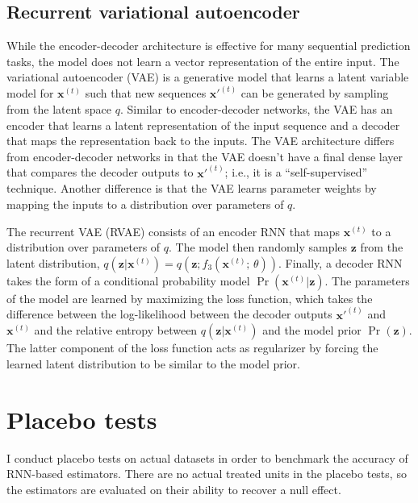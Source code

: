\documentclass[hidelinks,12pt]{article}
\begin{document}
\subsection{Recurrent variational autoencoder}

While the encoder-decoder architecture is effective for many sequential prediction tasks, the model does not learn a vector representation of the entire input. The variational autoencoder (VAE) \citep{kingma2013auto} is a generative model that learns a latent variable model for $\boldsymbol{x}^{(t)}$ such that new sequences $\boldsymbol{x'}^{(t)}$ can be generated by sampling from the latent space $q$. Similar to encoder-decoder networks, the VAE has an encoder that learns a latent representation of the input sequence and a decoder that maps the representation back to the inputs. The VAE architecture differs from encoder-decoder networks in that the VAE doesn't have a final dense layer that compares the decoder outputs to  $\boldsymbol{x'}^{(t)}$; i.e., it is a ``self-supervised'' technique. Another difference is that the VAE learns parameter weights by mapping the inputs to a distribution over parameters of $q$.

The recurrent VAE (RVAE) \citep{fabius2014variational, chung2015recurrent,bowman2015generating} consists of an encoder RNN that maps $\boldsymbol{x}^{(t)}$ to a distribution over parameters of $q$. The model then randomly samples $\boldsymbol{z}$ from the latent distribution, $q(\boldsymbol{z} | \boldsymbol{x}^{(t)}) = q (\boldsymbol{z}; f_3 (\boldsymbol{x}^{(t)};\, \theta))$. Finally, a decoder RNN takes the form of a conditional probability model $\Pr (\boldsymbol{x}^{(t)} | \boldsymbol{z})$. The parameters of the model are learned by maximizing the loss function, which takes the difference between the log-likelihood between the decoder outputs $\boldsymbol{x'}^{(t)}$ and $\boldsymbol{x}^{(t)}$ and the relative entropy between  $q(\boldsymbol{z} | \boldsymbol{x}^{(t)})$ and the model prior $\Pr (\boldsymbol{z})$. The latter component of the loss function acts as regularizer by forcing the learned latent distribution to be similar to the model prior. 

\section{Placebo tests} \label{placebo}

I conduct placebo tests on actual datasets in order to benchmark the accuracy of RNN-based estimators. There are no actual treated units in the placebo tests, so the estimators are evaluated on their ability to recover a null effect. 
\end{document}
